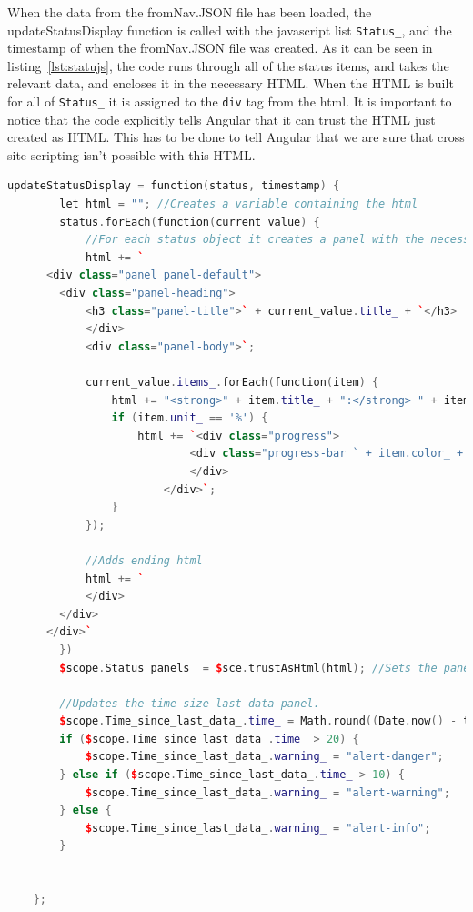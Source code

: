 When the data from the fromNav.JSON file has been loaded, the updateStatusDisplay function is called with the javascript list \texttt{Status_}, and the timestamp of when the fromNav.JSON file was created. As it can be seen in listing~\ref{lst:statujs}, the code runs through all of the status items, and takes the relevant data, and encloses it in the necessary HTML. When the HTML is built for all of \texttt{Status_} it is assigned to the \texttt{div} tag from the html. It is important to notice that the code explicitly tells Angular that it can trust the HTML just created as HTML. This has to be done to tell Angular that we are sure that cross site scripting isn't possible with this HTML. 

\begin{lstlisting}[caption = {displaying status messages }, captionpos=b, label={lst:statusjs}, language=C++,firstnumber=1]
updateStatusDisplay = function(status, timestamp) {
        let html = ""; //Creates a variable containing the html
        status.forEach(function(current_value) {
			//For each status object it creates a panel with the necessary data
            html += `
      <div class="panel panel-default">
      	<div class="panel-heading">
      		<h3 class="panel-title">` + current_value.title_ + `</h3>
      		</div>
      		<div class="panel-body">`;

            current_value.items_.forEach(function(item) {
                html += "<strong>" + item.title_ + ":</strong> " + item.data_ + " " + item.unit_ + "<br />"
                if (item.unit_ == '%') {
                    html += `<div class="progress">
                  			<div class="progress-bar ` + item.color_ + `  " role="progressbar" aria-valuenow="0" aria-valuemin="0" aria-valuemax="100" style="width: ` + item.data_ + `%">
                  			</div>
                  		</div>`;
                }
            });

			//Adds ending html
            html += `
      		</div>
      	</div>
      </div>`
        })
        $scope.Status_panels_ = $sce.trustAsHtml(html); //Sets the panels to the html created and trusts it, maybe not good for security

		//Updates the time size last data panel.
        $scope.Time_since_last_data_.time_ = Math.round((Date.now() - timestamp) / 1000);
        if ($scope.Time_since_last_data_.time_ > 20) {
            $scope.Time_since_last_data_.warning_ = "alert-danger";
        } else if ($scope.Time_since_last_data_.time_ > 10) {
            $scope.Time_since_last_data_.warning_ = "alert-warning";
        } else {
            $scope.Time_since_last_data_.warning_ = "alert-info";
        }


    };
\end{lstlisting}


